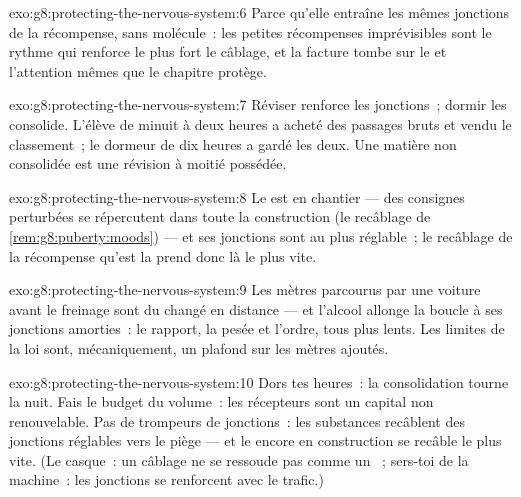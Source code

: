 \begin{solution}{exo:g8:protecting-the-nervous-system:6}
Parce qu'elle entraîne les mêmes jonctions de la
récompense, sans molécule~: les petites récompenses
imprévisibles sont le rythme qui renforce le plus fort le
câblage, et la facture tombe sur le  et l'attention
mêmes que le chapitre protège.
\end{solution}

\begin{solution}{exo:g8:protecting-the-nervous-system:7}
Réviser renforce les jonctions~; dormir les consolide.
L'élève de minuit à deux heures a acheté des passages bruts
et vendu le classement~; le dormeur de dix heures a gardé
les deux. Une matière non consolidée est une révision à
moitié possédée.
\end{solution}

\begin{solution}{exo:g8:protecting-the-nervous-system:8}
Le   est en chantier --- des consignes
perturbées se répercutent dans toute la construction (le
recâblage de \cref{rem:g8:puberty:moods}) --- et ses
jonctions sont au plus réglable~; le recâblage de la
récompense qu'est la  prend donc là le plus vite.
\end{solution}

\begin{solution}{exo:g8:protecting-the-nervous-system:9}
Les mètres parcourus par une voiture avant le freinage sont
du  changé en distance --- et l'alcool
allonge la boucle à ses jonctions amorties~: le rapport, la
pesée et l'ordre, tous plus lents. Les limites de la loi
sont, mécaniquement, un plafond sur les mètres ajoutés.
\end{solution}

\begin{solution}{exo:g8:protecting-the-nervous-system:10}
Dors tes heures~: la consolidation tourne la nuit. Fais le
budget du volume~: les récepteurs sont un capital non
renouvelable. Pas de trompeurs de jonctions~: les
substances recâblent des jonctions réglables vers le piège
--- et le  encore en construction se recâble le plus
vite. (Le casque~: un câblage ne se ressoude pas comme un
~; sers-toi de la machine~: les jonctions se renforcent
avec le trafic.)
\end{solution}

